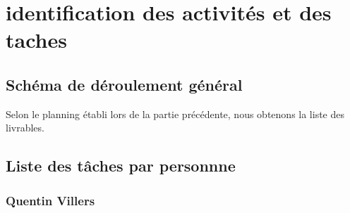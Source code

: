 \section{identification des activités et des taches}

\subsection{Schéma de déroulement général}

Selon le planning établi lors de la partie précédente, nous obtenons la liste des livrables.

\subsection{Liste des tâches par personnne}

\subsubsection{Quentin Villers}

